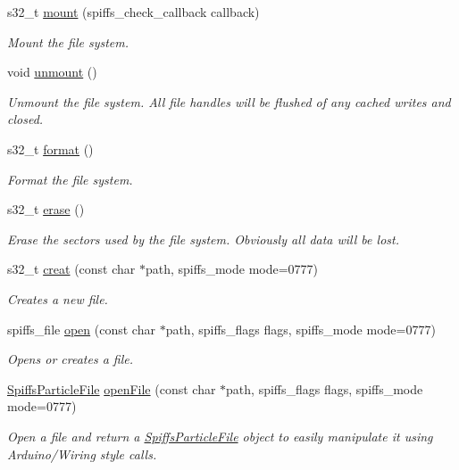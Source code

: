\begin{DoxyCompactItemize}
s32\+\_\+t \mbox{\hyperlink{class_spiffs_particle_a55ce37570d764bb8d00698903211fee8}{mount}} (spiffs\+\_\+check\+\_\+callback callback)
\begin{DoxyCompactList}\small\item\em Mount the file system. \end{DoxyCompactList}\item 
void \mbox{\hyperlink{class_spiffs_particle_a2f1b8abb2c89f1935675240430907f7e}{unmount}} ()
\begin{DoxyCompactList}\small\item\em Unmount the file system. All file handles will be flushed of any cached writes and closed. \end{DoxyCompactList}\item 
s32\+\_\+t \mbox{\hyperlink{class_spiffs_particle_a31500330ba98a081bc7b41f027406bf0}{format}} ()
\begin{DoxyCompactList}\small\item\em Format the file system. \end{DoxyCompactList}\item 
s32\+\_\+t \mbox{\hyperlink{class_spiffs_particle_a377b6476c59d353cedc0c666a3998af4}{erase}} ()
\begin{DoxyCompactList}\small\item\em Erase the sectors used by the file system. Obviously all data will be lost. \end{DoxyCompactList}\item 
s32\+\_\+t \mbox{\hyperlink{class_spiffs_particle_ac2714880969a1b6625de152105e291f5}{creat}} (const char $\ast$path, spiffs\+\_\+mode mode=0777)
\begin{DoxyCompactList}\small\item\em Creates a new file. \end{DoxyCompactList}\item 
spiffs\+\_\+file \mbox{\hyperlink{class_spiffs_particle_a0f13439808a65feb0d307de157598b96}{open}} (const char $\ast$path, spiffs\+\_\+flags flags, spiffs\+\_\+mode mode=0777)
\begin{DoxyCompactList}\small\item\em Opens or creates a file. \end{DoxyCompactList}\item 
\mbox{\hyperlink{class_spiffs_particle_file}{Spiffs\+Particle\+File}} \mbox{\hyperlink{class_spiffs_particle_a19e88cd7e5e352ab0222ac8d5ece430b}{open\+File}} (const char $\ast$path, spiffs\+\_\+flags flags, spiffs\+\_\+mode mode=0777)
\begin{DoxyCompactList}\small\item\em Open a file and return a \mbox{\hyperlink{class_spiffs_particle_file}{Spiffs\+Particle\+File}} object to easily manipulate it using Arduino/\+Wiring style calls. \end{DoxyCompactList}\item 

\end{DoxyCompactItemize}
